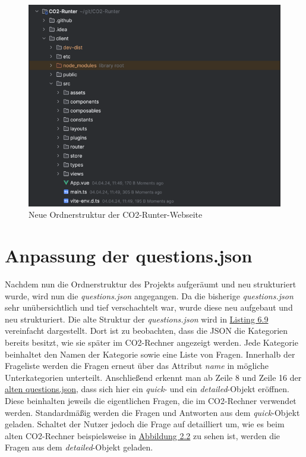 \begin{figure}[h]
    \centering
    \includegraphics[width=1\textwidth]{images/06/ordnerstruktur_projekt.png}
    \caption{Neue Ordnerstruktur der CO2-Runter-Webseite}
    \label{fig:ordnerstruktur_neu}
\end{figure}

\section{Anpassung der questions.json}
\label{sec:anpassung-der-questions-json}

Nachdem nun die Ordnerstruktur des Projekts aufgeräumt und neu strukturiert wurde, wird nun die \textit{questions.json} angegangen. Da die bisherige \textit{questions.json} sehr unübersichtlich und tief verschachtelt war, wurde diese neu aufgebaut und neu strukturiert. Die alte Struktur der \textit{questions.json} wird in \hyperref[lst:questions-json-old]{Listing 6.9} vereinfacht dargestellt. Dort ist zu beobachten, dass die \acs{JSON} die Kategorien bereits besitzt, wie sie später im CO2-Rechner angezeigt werden. Jede Kategorie beinhaltet den Namen der Kategorie sowie eine Liste von Fragen. Innerhalb der Frageliste werden die Fragen erneut über das Attribut \textit{name} in mögliche Unterkategorien unterteilt. Anschließend erkennt man ab Zeile 8 und Zeile 16 der \hyperref[lst:questions-json-old]{alten questions.json}, dass sich hier ein \textit{quick}- und ein \textit{detailed}-Objekt eröffnen. Diese beinhalten jeweils die eigentlichen Fragen, die im CO2-Rechner verwendet werden. Standardmäßig werden die Fragen und Antworten aus dem \textit{quick}-Objekt geladen. Schaltet der Nutzer jedoch die Frage auf detailliert um, wie es beim alten CO2-Rechner beispielsweise in \hyperref[fig:co2runterapp-rechner]{Abbildung 2.2} zu sehen ist, werden die Fragen aus dem \textit{detailed}-Objekt geladen.

